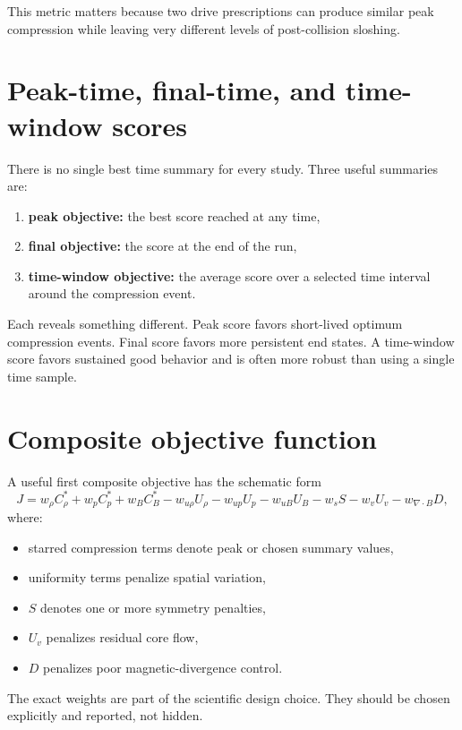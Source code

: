 \documentclass[11pt]{article}
\begin{document}
This metric matters because two drive prescriptions can produce similar peak compression while leaving very different levels of post-collision sloshing.

\section{Peak-time, final-time, and time-window scores}
There is no single best time summary for every study. Three useful summaries are:
\begin{enumerate}
    \item \textbf{peak objective:} the best score reached at any time,
    \item \textbf{final objective:} the score at the end of the run,
    \item \textbf{time-window objective:} the average score over a selected time interval around the compression event.
\end{enumerate}

Each reveals something different. Peak score favors short-lived optimum compression events. Final score favors more persistent end states. A time-window score favors sustained good behavior and is often more robust than using a single time sample.

\section{Composite objective function}
A useful first composite objective has the schematic form
\[
J = w_{\rho} C_{\rho}^{\ast} + w_p C_p^{\ast} + w_B C_B^{\ast}
- w_{u\rho} U_{\rho} - w_{up} U_p - w_{uB} U_B - w_s S - w_v U_v - w_{\nabla\!\cdot\!B} D,
\]
where:
\begin{itemize}
    \item starred compression terms denote peak or chosen summary values,
    \item uniformity terms penalize spatial variation,
    \item $S$ denotes one or more symmetry penalties,
    \item $U_v$ penalizes residual core flow,
    \item $D$ penalizes poor magnetic-divergence control.
\end{itemize}

The exact weights are part of the scientific design choice. They should be chosen explicitly and reported, not hidden.
\end{document}
